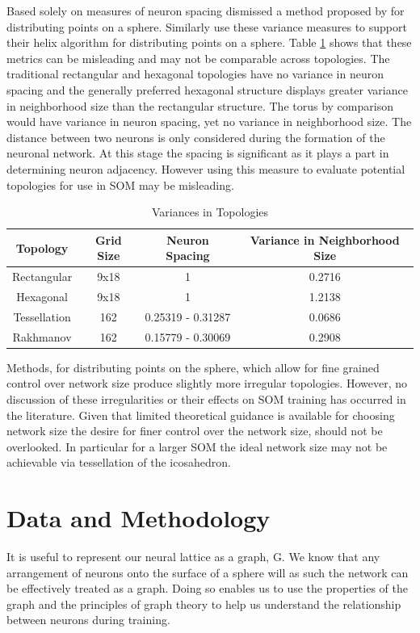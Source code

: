 \documentclass[11pt]{article}
\begin{document}
Based solely on measures of neuron spacing \cite{wu2005} dismissed a method
proposed by \cite{Rakhmanov94} for distributing points on a sphere.  Similarly
\cite{Nishio:2006fk} use these variance measures to support their helix
algorithm for distributing points on a sphere.  Table \ref{table1} shows that
these metrics can be misleading and may not be comparable across topologies.
The traditional rectangular and hexagonal topologies have no variance in neuron
spacing and the generally preferred hexagonal structure displays greater
variance in neighborhood size than the rectangular structure.  The torus by
comparison would have variance in neuron spacing, yet no variance in
neighborhood size.  The distance between two neurons is only considered during
the formation of the neuronal network.  At this stage the spacing is significant
as it plays a part in determining neuron adjacency. However using this measure
to evaluate potential topologies for use in SOM may be misleading.

\begin{table}[htbp]
\caption{Variances in Topologies}
\begin{center}
\begin{tabular}{|c|c|c|c|}
\hline
Topology&Grid Size&Neuron Spacing&Variance in Neighborhood Size\\
\hline
Rectangular&9x18&1&0.2716\\
Hexagonal&9x18&1&1.2138\\
Tessellation&162&0.25319 - 0.31287& 0.0686\\
Rakhmanov&162&0.15779 - 0.30069& 0.2908\\
\hline
\end{tabular}
\end{center}
\label{table1}
\end{table}

Methods, for distributing points on the sphere, which allow for fine grained
control over network size produce slightly more irregular topologies.  However,
no discussion of these irregularities or their effects on SOM training has
occurred in the literature. Given that limited theoretical guidance is available
for choosing network size the desire for finer control over the network size,
should not be overlooked. In particular for a larger SOM the ideal network size
may not be achievable via tessellation of the icosahedron.

\section{Data and Methodology}
It is useful to represent our neural lattice as a graph, G.
We know that any arrangement of neurons onto the surface of a sphere will 
 as such the network can be effectively treated as a graph.  Doing so enables us to use the properties of the graph and the principles of graph theory to help us understand the relationship between neurons during training.
\end{document}
